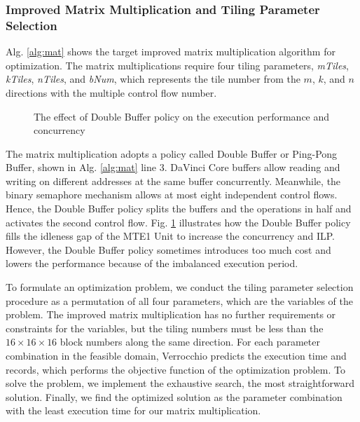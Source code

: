 \subsubsection{Improved Matrix Multiplication and Tiling Parameter Selection}

Alg. \ref{alg:mat} shows the target improved matrix multiplication algorithm for optimization. The matrix multiplications require four tiling parameters, \textit{mTiles}, \textit{kTiles}, \textit{nTiles}, and \textit{bNum}, which represents the tile number from the $m$, $k$, and $n$ directions with the multiple control flow number. 

\begin{figure}[tbp]
    \captionsetup{justification=centering}
    \caption{The effect of Double Buffer policy on the execution performance and concurrency}
    \label{fig:doubleb}
    \end{figure}

The matrix multiplication adopts a policy called Double Buffer or Ping-Pong Buffer, shown in Alg. \ref{alg:mat} line 3. DaVinci Core buffers allow reading and writing on different addresses at the same buffer concurrently. Meanwhile, the binary semaphore mechanism allows at most eight independent control flows. Hence, the Double Buffer policy splits the buffers and the operations in half and activates the second control flow. Fig. \ref{fig:doubleb} illustrates how the Double Buffer policy fills the idleness gap of the MTE1 Unit to increase the concurrency and ILP. However, the Double Buffer policy sometimes introduces too much cost and lowers the performance because of the imbalanced execution period.

To formulate an optimization problem, we conduct the tiling parameter selection procedure as a permutation of all four parameters, which are the variables of the problem. The improved matrix multiplication has no further requirements or constraints for the variables, but the tiling numbers must be less than the $16 \times 16 \times 16$ block numbers along the same direction. For each parameter combination in the feasible domain, Verrocchio predicts the execution time and records, which performs the objective function of the optimization problem. To solve the problem, we implement the exhaustive search, the most straightforward solution. Finally, we find the optimized solution as the parameter combination with the least execution time for our matrix multiplication.

